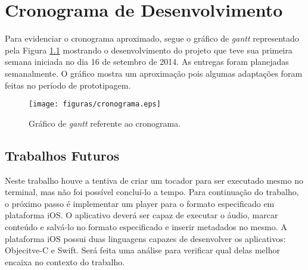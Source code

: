 \chapter[Cronograma de Desenvolvimento]{Cronograma de Desenvolvimento}\label{cap6}

Para evidenciar o cronograma aproximado, segue o gráfico de \textit{gantt} representado pela Figura \ref{cronograma} mostrando o desenvolvimento do projeto que teve sua primeira semana iniciada no dia 16 de setembro de 2014. As entregas foram planejadas semanalmente. O gráfico mostra um aproximação pois algumas adaptações foram feitas no período de prototipagem.


 \begin{figure}[ht]
	\centering
		\texttt{[image: figuras/cronograma.eps]}
	\caption{Gráfico de \textit{gantt} referente ao cronograma.}
	\label{cronograma}
\end{figure}

\section{Trabalhos Futuros}

Neste trabalho houve a tentiva de criar um tocador para ser executado mesmo no terminal, mas não foi possível concluí-lo a tempo. Para continuação do trabalho, o próximo passo é implementar um player para o formato especificado em plataforma iOS. O aplicativo deverá ser capaz de executar o áudio, marcar conteúdo e salvá-lo no formato especificado e inserir metadados no mesmo. A plataforma iOS possui duas linguagens capazes de desenvolver os aplicativos: Objecitve-C e Swift. Será feita uma análise para verificar qual delas melhor encaixa no contexto do trabalho. 